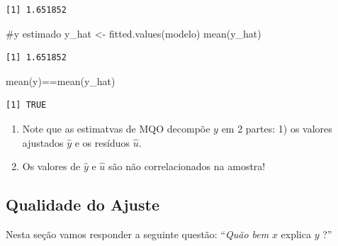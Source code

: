 \documentclass[
  letterpaper,
  DIV=11,
  numbers=noendperiod]{scrreprt}
\newenvironment{Shaded}{\begin{snugshade}}{\end{snugshade}}
\newcommand{\CommentTok}[1]{\textcolor[rgb]{0.37,0.37,0.37}{#1}}
\newcommand{\FunctionTok}[1]{\textcolor[rgb]{0.28,0.35,0.67}{#1}}
\newcommand{\NormalTok}[1]{\textcolor[rgb]{0.00,0.23,0.31}{#1}}
\newcommand{\OtherTok}[1]{\textcolor[rgb]{0.00,0.23,0.31}{#1}}
\newcommand{\SpecialCharTok}[1]{\textcolor[rgb]{0.37,0.37,0.37}{#1}}
\begin{document}
\begin{Shaded}
\end{Shaded}

\begin{verbatim}
[1] 1.651852
\end{verbatim}

\begin{Shaded}
\begin{Highlighting}[]
\CommentTok{\#y estimado}
\NormalTok{y\_hat }\OtherTok{\textless{}{-}} \FunctionTok{fitted.values}\NormalTok{(modelo)}
\FunctionTok{mean}\NormalTok{(y\_hat)}
\end{Highlighting}
\end{Shaded}

\begin{verbatim}
[1] 1.651852
\end{verbatim}

\begin{Shaded}
\begin{Highlighting}[]
\FunctionTok{mean}\NormalTok{(y)}\SpecialCharTok{==}\FunctionTok{mean}\NormalTok{(y\_hat)}
\end{Highlighting}
\end{Shaded}

\begin{verbatim}
[1] TRUE
\end{verbatim}

\begin{enumerate}
\def\labelenumi{(\arabic{enumi})}
\setcounter{enumi}{4}
\item
  Note que as estimatvas de MQO decompõe \(y\) em 2 partes: 1) os
  valores ajustados \(\hat{y}\) e os resíduos \(\hat{u}\).
\item
  Os valores de \(\hat{y}\) e \(\hat{u}\) são não correlacionados na
  amostra!
\end{enumerate}

\subsection{Qualidade do Ajuste}\label{qualidade-do-ajuste}

Nesta seção vamos responder a seguinte questão: ``\emph{Quão bem} \(x\)
explica \(y\) ?''
\end{document}

